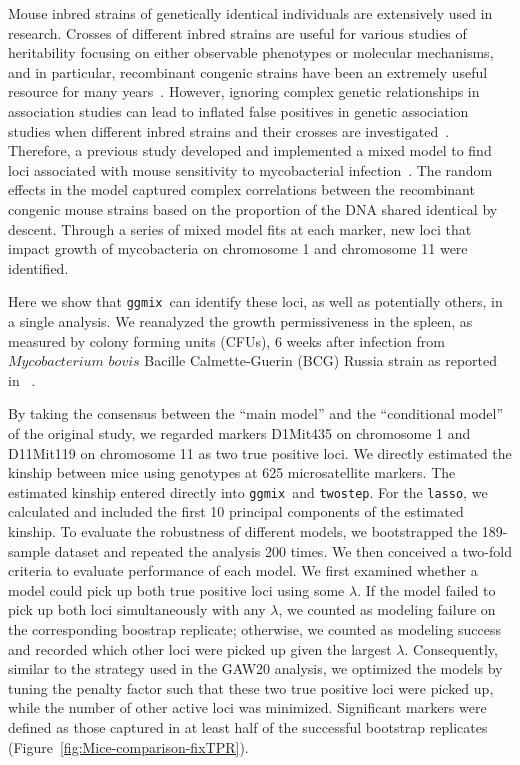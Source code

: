 \documentclass[10pt,letterpaper]{article}
\newcommand{\ggmix}{\texttt{ggmix}}
\begin{document}
	Mouse inbred strains of genetically identical individuals are extensively used in research.
	Crosses of different inbred strains are useful for various studies of heritability focusing on either observable phenotypes or molecular mechanisms, and in particular, recombinant congenic strains have been an extremely useful resource for many years~\cite{fortin2001recombinant}.
	However, ignoring complex genetic relationships in association studies can lead to inflated false positives in genetic association studies when different inbred strains and their crosses are investigated~\cite{bennett2010high,flint2012genome,cheng2010genome}.
	Therefore, a previous study developed and implemented a mixed model to find loci associated with mouse sensitivity to mycobacterial infection~\cite{di2010strain}. The random effects in the model captured complex correlations between the recombinant congenic mouse strains based on the proportion of the DNA shared identical by descent. Through a series of mixed model fits at each marker, new loci that impact growth of mycobacteria on chromosome 1 and chromosome 11 were identified.
	
	Here we show that \ggmix ~can identify these loci, as well as potentially others, in a single analysis. We reanalyzed the growth permissiveness in the spleen, as measured by colony forming units (CFUs), 6 weeks after infection from $Mycobacterium$ $bovis$ Bacille Calmette-Guerin (BCG) Russia strain as reported in ~\cite{di2010strain}.
	
	By taking the consensus between the ``main model'' and the ``conditional model'' of the original study, we regarded markers D1Mit435 on chromosome 1 and D11Mit119 on chromosome 11 as two true positive loci.
	We directly estimated the kinship between mice using genotypes at 625 microsatellite markers. The estimated kinship entered directly into \ggmix ~and \texttt{twostep}. For the \texttt{lasso}, we calculated and included the first 10 principal components of the estimated kinship. To evaluate the robustness of different models, we bootstrapped the 189-sample dataset and repeated the analysis 200 times. We then conceived a two-fold criteria to evaluate performance of each model. We first examined whether a model could pick up both true positive loci using some $\lambda$. If the model failed to pick up both loci simultaneously with any $\lambda$, we counted as modeling failure on the corresponding boostrap replicate; otherwise, we counted as modeling success and recorded which other loci were picked up given the largest $\lambda$. Consequently, similar to the strategy used in the GAW20 analysis, we optimized the models by tuning the penalty factor such that these two true positive loci were picked up, while the number of other active loci was minimized.
	Significant markers were defined as those captured in at least half of the successful bootstrap replicates (Figure~\ref{fig:Mice-comparison-fixTPR}).
	
\end{document}
